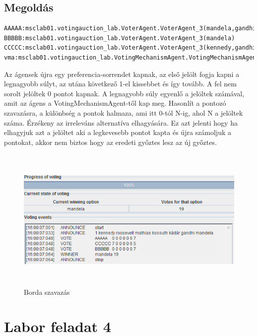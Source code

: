 \subsection{Megoldás}
\begin{lstlisting}[caption=Használt run-config, frame=single,float=!ht]
AAAAA:msclab01.votingauction_lab.VoterAgent.VoterAgent_3(mandela,gandhi)
BBBBB:msclab01.votingauction_lab.VoterAgent.VoterAgent_3(mandela)
CCCCC:msclab01.votingauction_lab.VoterAgent.VoterAgent_3(kennedy,gandhi,mandela)
vma:msclab01.votingauction_lab.VotingMechanismAgent.VotingMechanismAgent(voting01.cfg)
\end{lstlisting}
Az ágensek újra egy preferencia-sorrendet kapnak, az első jelölt fogja kapni a legnagyobb súlyt, az utána következő 1-el kissebbet és így tovább. A fel nem sorolt jelöltek 0 pontot kapnak. A legnagyobb súly egyenlő a jelöltek számával, amit az ágens a VotingMechanismAgent-től kap meg. Hasonlít a pontozó szavazásra, a különbség a pontok halmaza, ami itt 0-tól N-ig, ahol  N a jelöltek száma. Érzékeny az irreleváns alternatíva elhagyására. Ez azt jelenti hogy ha elhagyjuk azt a jelöltet aki a legkevesebb pontot kapta és újra számoljuk a pontokat, akkor nem biztos hogy az eredeti győztes lesz az új győztes.
\begin{figure}[!h]
\begin{center}
\includegraphics[height=7cm]{figures/fel3.png}
\caption{Borda szavazás}
\end{center}
\end{figure}

\section{Labor feladat 4}
